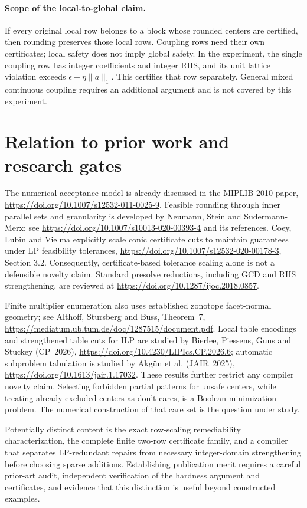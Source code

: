 \documentclass[11pt]{article}
\begin{document}
\paragraph{Scope of the local-to-global claim.}
If every original local row belongs to a block whose rounded centers are certified,
then rounding preserves those local rows. Coupling rows need their own certificates;
local safety does not imply global safety. In the experiment, the single coupling
row has integer coefficients and integer RHS, and its unit lattice violation exceeds
$\epsilon+\eta\|a\|_1$. This certifies that row separately. General mixed continuous
coupling requires an additional argument and is not covered by this experiment.

\section{Relation to prior work and research gates}
The numerical acceptance model is already discussed in the MIPLIB 2010 paper,
\url{https://doi.org/10.1007/s12532-011-0025-9}. Feasible rounding through inner
parallel sets and granularity is developed by Neumann, Stein and Sudermann-Merx;
see \url{https://doi.org/10.1007/s10013-020-00393-4} and its references. Coey, Lubin
and Vielma explicitly scale conic certificate cuts to maintain guarantees under LP
feasibility tolerances, \url{https://doi.org/10.1007/s12532-020-00178-3}, Section 3.2.
Consequently, certificate-based tolerance scaling alone is not a defensible novelty
claim. Standard presolve reductions, including GCD and RHS strengthening, are
reviewed at \url{https://doi.org/10.1287/ijoc.2018.0857}.

Finite multiplier enumeration also uses established zonotope facet-normal geometry;
see Althoff, Stursberg and Buss, Theorem~7,
\url{https://mediatum.ub.tum.de/doc/1287515/document.pdf}.
Local table encodings and strengthened table cuts for ILP are studied by Bierlee,
Piessens, Guns and Stuckey (CP~2026),
\url{https://doi.org/10.4230/LIPIcs.CP.2026.6}; automatic subproblem tabulation is
studied by Akg\"un et al. (JAIR~2025),
\url{https://doi.org/10.1613/jair.1.17032}. These results further restrict any
compiler novelty claim. Selecting forbidden partial patterns for unsafe centers,
while treating already-excluded centers as don't-cares, is a Boolean minimization
problem. The numerical construction of that care set is the question under study.

Potentially distinct content is the exact row-scaling remediability characterization,
the complete finite two-row certificate family, and a compiler that separates
LP-redundant repairs from necessary integer-domain strengthening before choosing
sparse additions. Establishing publication merit requires a careful prior-art audit,
independent verification of the hardness argument and certificates, and evidence
that this distinction is useful beyond constructed examples.
\end{document}

